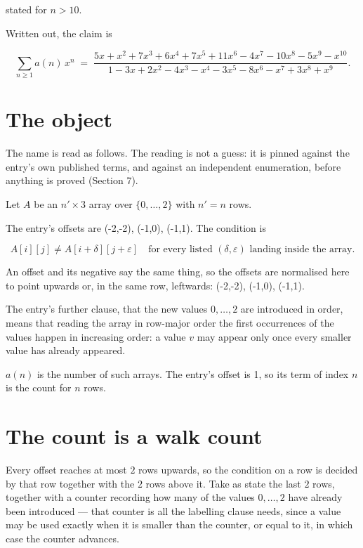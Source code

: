 \documentclass[11pt]{article}
\theoremstyle{definition}
\begin{document}
stated for $n > 10$.

Written out, the claim is

\[\sum_{n \ge 1} a(n)\,x^n \;=\; \frac{5x + x^{2} + 7x^{3} + 6x^{4} + 7x^{5} + 11x^{6} - 4x^{7} - 10x^{8} - 5x^{9} - x^{10}}{1 - 3x + 2x^{2} - 4x^{3} - x^{4} - 3x^{5} - 8x^{6} - x^{7} + 3x^{8} + x^{9}}.\]

\section{The object}

The name is read as follows. The reading is not a guess: it is pinned against the entry's own published terms, and against an independent enumeration, before anything is proved (Section 7).

Let $A$ be an $n' \times 3$ array over $\{0,\dots,2\}$ with $n' = n$ rows.

The entry's offsets are (-2,-2), (-1,0), (-1,1). The condition is

\[A[i][j] \ne A[i{+}\delta][j{+}\varepsilon]\quad\text{for every listed }(\delta,\varepsilon)\text{ landing inside the array.}\]

An offset and its negative say the same thing, so the offsets are normalised here to point upwards or, in the same row, leftwards: (-2,-2), (-1,0), (-1,1).

The entry's further clause, that the new values $0,\dots,2$ are introduced in order, means that reading the array in row-major order the first occurrences of the values happen in increasing order: a value $v$ may appear only once every smaller value has already appeared.

$a(n)$ is the number of such arrays. The entry's offset is 1, so its term of index $n$ is the count for $n$ rows.

\section{The count is a walk count}

Every offset reaches at most $2$ rows upwards, so the condition on a row is decided by that row together with the $2$ rows above it. Take as state the last $2$ rows, together with a counter recording how many of the values $0,\dots,2$ have already been introduced --- that counter is all the labelling clause needs, since a value may be used exactly when it is smaller than the counter, or equal to it, in which case the counter advances.
\end{document}
